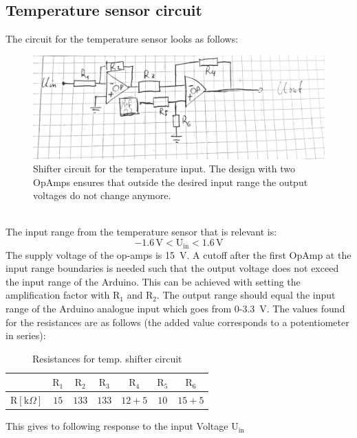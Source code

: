 \documentclass[12pt]{scrartcl}
\begin{document}
    \subsection{Temperature sensor circuit}
      The circuit for the temperature sensor looks as follows:
      \begin{figure}[h]
        \includegraphics[width = \textwidth]{circ.png}
        \caption{Shifter circuit for the temperature input. The design with
        two OpAmps ensures that outside the desired input range the output
        voltages do not change anymore.}
        \label{fig1}
      \end{figure}
      \\The input range from the temperature sensor that is relevant is:
      $$-1.6 \, \text{V} < \text{U}_{\text{in}} < 1.6\, \text{V}$$
      The supply voltage of the op-amps is 15~V. A cutoff after
      the first OpAmp at the input range boundaries is needed such that the
      output voltage does not exceed the input range of the Arduino. This can be
      achieved with
      setting the amplification factor with $\text{R}_1$ and $\text{R}_2$. The output range
      should equal the input range of the Arduino analogue input which goes from
      0-3.3~V. The values found for the resistances are as follows (the added value
      corresponds to a potentiometer in series): \\
      \begin{table}[H]\label{tempres}
        \begin{tabular}{l|c c c c c c}
          & $\text{R}_1$ & $\text{R}_2$ & $\text{R}_3$ & $\text{R}_4$
          & $\text{R}_5$ & $\text{R}_6$ \\
          \hline\vspace{5pt}
          $\text{R}[\text{k}\Omega]$ & $15$ & $133$ & $133$ & $12 + 5$ & $10$
          & $15 + 5$
        \end{tabular}
        \caption{Resistances for temp. shifter circuit}
        \label{tempres}
      \end{table}
      This gives to following response to the input Voltage $\text{U}_{\text{in}}$\\
\end{document}
